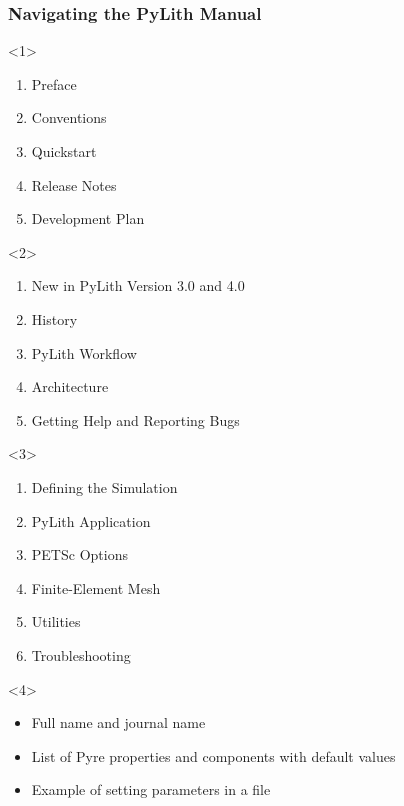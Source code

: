 \documentclass[aspectratio=169]{beamer}
\begin{document}
\begin{frame}[t]
  \frametitle{Navigating the PyLith Manual}
  \summary{}

  \begin{itemize}
    \begin{onlyenv}<1>
      \begin{enumerate}
      \item Preface
      \item Conventions
      \item Quickstart
      \item Release Notes
      \item Development Plan
      \end{enumerate}
    \end{onlyenv}
    \begin{onlyenv}<2>
      \begin{enumerate}
      \item New in PyLith Version 3.0 and 4.0
      \item History
      \item PyLith Workflow
      \item Architecture
      \item Getting Help and Reporting Bugs
      \end{enumerate}
    \end{onlyenv}
    \begin{onlyenv}<3>
      \begin{enumerate}
      \item Defining the Simulation
      \item PyLith Application
      \item PETSc Options
      \item Finite-Element Mesh
      \item Utilities
      \item Troubleshooting
      \end{enumerate}
    \end{onlyenv}
    \begin{onlyenv}<4>
      \begin{itemize}
      \item Full name and journal name
      \item List of Pyre properties and components with default values
      \item Example of setting parameters in a  file

\end{itemize}
\end{onlyenv}
\end{itemize}
\end{frame}
\end{document}

